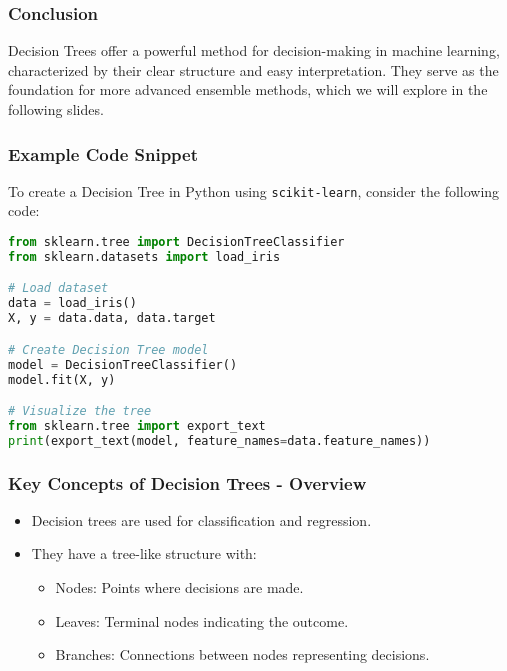 \documentclass[aspectratio=169]{beamer}
\begin{document}
\begin{frame}[fragile]
    \frametitle{Conclusion}
    Decision Trees offer a powerful method for decision-making in machine learning, characterized by their clear structure and easy interpretation. 
    They serve as the foundation for more advanced ensemble methods, which we will explore in the following slides.
\end{frame}

\begin{frame}[fragile]
    \frametitle{Example Code Snippet}
    To create a Decision Tree in Python using \texttt{scikit-learn}, consider the following code:
    \begin{lstlisting}[language=Python]
from sklearn.tree import DecisionTreeClassifier
from sklearn.datasets import load_iris

# Load dataset
data = load_iris()
X, y = data.data, data.target

# Create Decision Tree model
model = DecisionTreeClassifier()
model.fit(X, y)

# Visualize the tree
from sklearn.tree import export_text
print(export_text(model, feature_names=data.feature_names))
    \end{lstlisting}
\end{frame}

\begin{frame}[fragile]
    \frametitle{Key Concepts of Decision Trees - Overview}
    \begin{itemize}
        \item Decision trees are used for classification and regression.
        \item They have a tree-like structure with:
        \begin{itemize}
            \item Nodes: Points where decisions are made.
            \item Leaves: Terminal nodes indicating the outcome.
            \item Branches: Connections between nodes representing decisions.
        \end{itemize}
    \end{itemize}
\end{frame}
\end{document}
